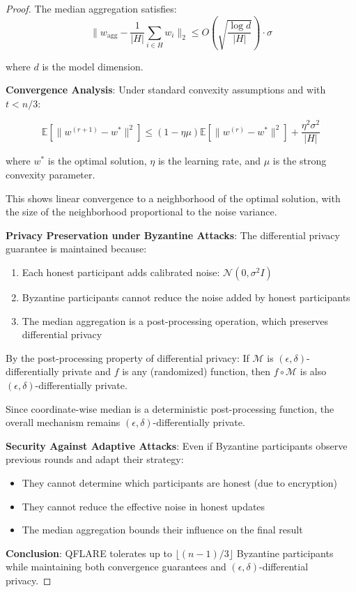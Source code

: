 \documentclass[11pt]{article}
\begin{document}
\begin{proof}
The median aggregation satisfies:
$$\|w_{\text{agg}} - \frac{1}{|H|}\sum_{i \in H} w_i\|_2 \leq O\left(\sqrt{\frac{\log d}{|H|}}\right) \cdot \sigma$$

where $d$ is the model dimension.

\textbf{Convergence Analysis}:
Under standard convexity assumptions and with $t < n/3$:

$$\mathbb{E}[\|w^{(r+1)} - w^*\|^2] \leq (1 - \eta\mu)\mathbb{E}[\|w^{(r)} - w^*\|^2] + \frac{\eta^2\sigma^2}{|H|}$$

where $w^*$ is the optimal solution, $\eta$ is the learning rate, and $\mu$ is the strong convexity parameter.

This shows linear convergence to a neighborhood of the optimal solution, 
with the size of the neighborhood proportional to the noise variance.

\textbf{Privacy Preservation under Byzantine Attacks}:
The differential privacy guarantee is maintained because:
\begin{enumerate}
\item Each honest participant adds calibrated noise: $\mathcal{N}(0, \sigma^2 I)$
\item Byzantine participants cannot reduce the noise added by honest participants
\item The median aggregation is a post-processing operation, which preserves differential privacy
\end{enumerate}

By the post-processing property of differential privacy:
If $\mathcal{M}$ is $(\epsilon, \delta)$-differentially private and $f$ is any (randomized) function, 
then $f \circ \mathcal{M}$ is also $(\epsilon, \delta)$-differentially private.

Since coordinate-wise median is a deterministic post-processing function, 
the overall mechanism remains $(\epsilon, \delta)$-differentially private.

\textbf{Security Against Adaptive Attacks}:
Even if Byzantine participants observe previous rounds and adapt their strategy:
\begin{itemize}
\item They cannot determine which participants are honest (due to encryption)
\item They cannot reduce the effective noise in honest updates
\item The median aggregation bounds their influence on the final result
\end{itemize}

\textbf{Conclusion}: QFLARE tolerates up to $\lfloor(n-1)/3\rfloor$ Byzantine participants 
while maintaining both convergence guarantees and $(\epsilon, \delta)$-differential privacy.
\end{proof}
\end{document}
